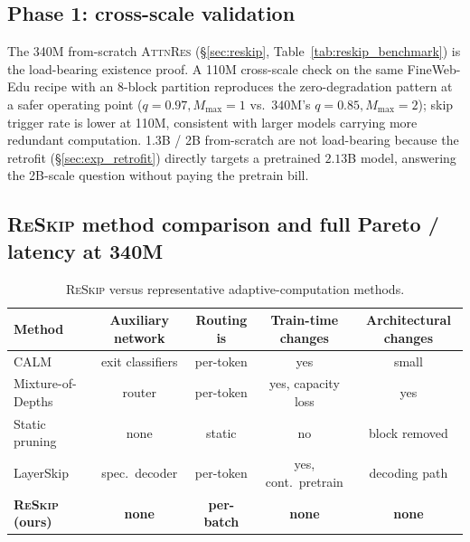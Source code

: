 \documentclass{article}
\newcommand{\attnres}{\textsc{AttnRes}}
\newcommand{\reskip}{\textsc{ReSkip}}
\begin{document}
\subsection{Phase 1: cross-scale validation}
\label{app:phase1}
The 340M from-scratch \attnres{} (\S\ref{sec:reskip}, Table~\ref{tab:reskip_benchmark}) is the load-bearing existence proof. A 110M cross-scale check on the same FineWeb-Edu recipe with an $8$-block partition reproduces the zero-degradation pattern at a safer operating point ($q{=}0.97, M_{\max}{=}1$ vs.\ $340$M's $q{=}0.85, M_{\max}{=}2$); skip trigger rate is lower at 110M, consistent with larger models carrying more redundant computation. 1.3B / 2B from-scratch are not load-bearing because the retrofit (\S\ref{sec:exp_retrofit}) directly targets a pretrained $2.13$B model, answering the 2B-scale question without paying the pretrain bill.

\subsection{\reskip{} method comparison and full Pareto / latency at 340M}
\label{app:method_comparison}
\begin{table}[h]
\caption{\reskip{} versus representative adaptive-computation methods.}
\centering\small
\begin{tabular}{lcccc}
\toprule
Method & Auxiliary network & Routing is & Train-time changes & Architectural changes \\
\midrule
CALM~\citep{schuster2022confident} & exit classifiers & per-token & yes & small \\
Mixture-of-Depths~\citep{raposo2024mixture} & router & per-token & yes, capacity loss & yes \\
Static pruning~\citep{gromov2024unreasonable} & none & static & no & block removed \\
LayerSkip~\citep{elhoushi2024layerskip} & spec.\ decoder & per-token & yes, cont.\ pretrain & decoding path \\
\textbf{\reskip{} (ours)} & \textbf{none} & \textbf{per-batch} & \textbf{none} & \textbf{none} \\
\bottomrule
\end{tabular}
\end{table}
\end{document}
